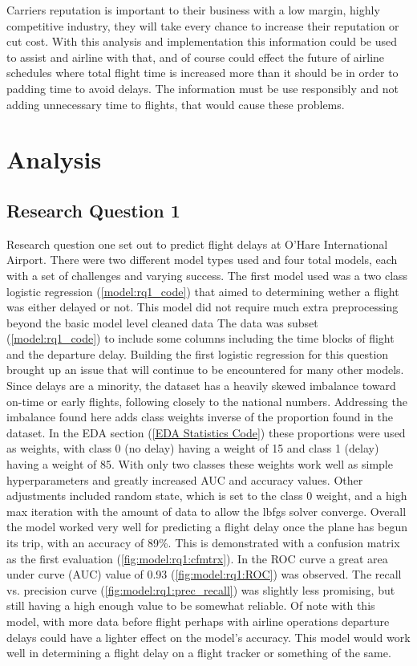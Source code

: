 \documentclass[a4paper,12pt]{article}
\begin{document}
Carriers reputation is important to their business with a low margin, highly competitive industry, they will take every chance to increase their reputation or cut cost.
With this analysis and implementation this information could be used to assist and airline with that, and of course could effect the future of airline schedules where total flight
time is increased more than it should be in order to padding time to avoid delays. The information must be use responsibly and not adding unnecessary time to flights, that
would cause these problems.

\pagebreak

\section{Analysis}

\subsection{Research Question 1} \label{analyze:rq1}

Research question one set out to predict flight delays at O'Hare International Airport. There were two different model types used and four total models, each with a set of challenges
and varying success. The first model used was a two class logistic regression (\ref{model:rq1_code}) that aimed to determining wether a flight was either delayed or not.
This model did not require much extra preprocessing beyond the basic model level cleaned data %
The data was subset (\ref{model:rq1_code}) to include some columns including the time blocks of flight and the departure delay.
Building the first logistic regression for this question brought up an issue that will continue to be encountered for many other models. Since delays are a minority, the dataset has a heavily
skewed imbalance toward on-time or early flights, following closely to the national numbers. Addressing the imbalance found here adds class weights inverse of the proportion found in the dataset.
In the EDA section (\ref{EDA Statistics Code}) these proportions were used as weights, with class 0 (no delay) having a weight of 15 and class 1 (delay) having a weight of 85. With only two classes these weights
work well as simple hyperparameters and greatly increased AUC and accuracy values. Other adjustments included random state, which is set to the class 0 weight, and a high max iteration with the amount of data to 
allow the lbfgs solver converge.
Overall the model worked very well for predicting a flight delay once the plane has begun its trip, with an accuracy of 89\%.
This is demonstrated with a confusion matrix as the first evaluation (\ref{fig:model:rq1:cfmtrx}).
In the ROC curve a great area under curve (AUC) value of 0.93 (\ref{fig:model:rq1:ROC}) was observed. The recall vs. precision curve (\ref{fig:model:rq1:prec_recall}) was slightly less promising, but still having a high enough value to be somewhat reliable.
Of note with this model, with more data before flight perhaps with airline operations
departure delays could have a lighter effect on the model's accuracy. This model would work well in determining a flight delay on a flight tracker or something of the same.
\end{document}
